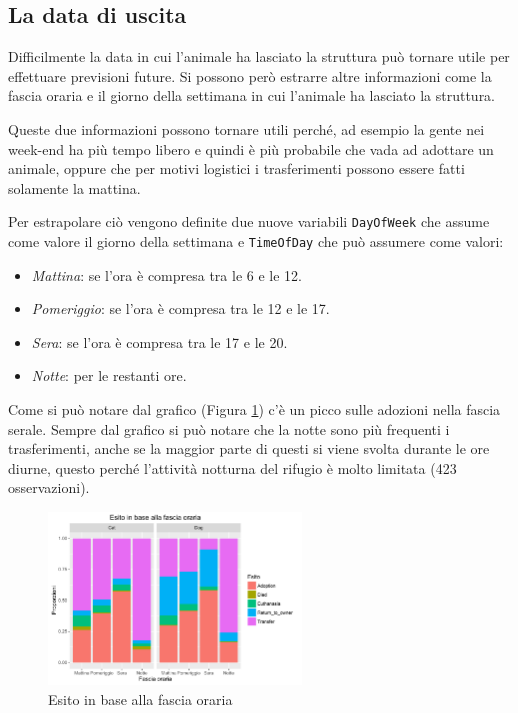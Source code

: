 \subsection{La data di uscita}

Difficilmente la data in cui l'animale ha lasciato la struttura può tornare utile per effettuare previsioni future. Si possono però estrarre altre informazioni come la fascia oraria e il giorno della settimana in cui l'animale ha lasciato la struttura. 

Queste due informazioni possono tornare utili perché, ad esempio la gente nei week-end ha più tempo libero e quindi è più probabile che vada ad adottare un animale, oppure che per motivi logistici i trasferimenti possono essere fatti solamente la mattina.

Per estrapolare ciò vengono definite due nuove variabili \texttt{DayOfWeek} che assume come valore il giorno della settimana e \texttt{TimeOfDay} che può assumere come valori:

\begin{itemize}
	\item \textit{Mattina}: se l'ora è compresa tra le 6 e le 12.
	\item \textit{Pomeriggio}: se l'ora è compresa tra le 12 e le 17.
	\item \textit{Sera}: se l'ora è compresa tra le 17 e le 20.
	\item \textit{Notte}: per le restanti ore.
\end{itemize}

Come si può notare dal grafico (Figura \ref{fig-time}) c'è un picco sulle adozioni nella fascia serale. Sempre dal grafico si può notare che la notte sono più frequenti i trasferimenti, anche se la maggior parte di questi si viene svolta durante le ore diurne, questo perché l'attività notturna del rifugio è molto limitata (423 osservazioni).

\begin{figure}[htbp]
	\centering
	\includegraphics[width=0.6\textwidth]{./grafici/esito_time.pdf}
	\caption{Esito in base alla fascia oraria}\label{fig-time}
\end{figure}

